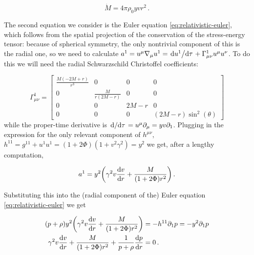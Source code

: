 \documentclass[main.tex]{subfiles}
\begin{document}
\begin{equation} \label{eq:mass-conservation-integral}
  \dot{M} = 4 \pi\rho_0 yvr^2 \,.
\end{equation}

The second equation we consider is the Euler equation \eqref{eq:relativistic-euler}, which follows from the spatial projection of the conservation of the stress-energy tensor:
because of spherical symmetry, the only nontrivial component of this is the radial one, so we need to calculate \(a^1 = u^\mu \nabla_\mu u^1 = \dv*{u^1}{\tau} + \Gamma^1_{\mu \nu} u^\mu u^\nu \). To do this we will need the radial Schwarzschild Christoffel coefficients:

\begin{equation}
  \Gamma^1_{\mu \nu} = \left[\begin{matrix}\frac{M \left(- 2 M + r\right)}{r^{3}} & 0 & 0 & 0\\0 & \frac{M}{r \left(2 M - r\right)} & 0 & 0\\0 & 0 & 2 M - r & 0\\0 & 0 & 0 & \left(2 M - r\right) \sin^{2}{\left(\theta \right)}\end{matrix}\right]
\end{equation}
while the proper-time derivative is \(\dv*{}{\tau} = u^\mu \partial_\mu = yv\partial_1\).
Plugging in the expression for the only relevant component of \(h^{\mu\nu}\), \(h^{11} = g^{11} + u^1 u^1 = (1 + 2 \Phi) (1 + v^2 \gamma^2) = y^2\)
we get, after a lengthy computation,

\begin{equation}
  a^1 = y^2 \qty(\gamma^2 v \dv{v}{r} + \frac{M}{(1+ 2 \Phi) r^2}) \,.
\end{equation}

Substituting this into the (radial component of the) Euler equation \eqref{eq:relativistic-euler} we get

\begin{subequations}
\begin{align}
  (p + \rho) y^2 \qty(\gamma^2 v \dv{v}{r} + \frac{M}{(1+ 2 \Phi) r^2}) &= - h^{1 1} \partial_1 p = - y^2 \partial_1 p \\
   \gamma^2 v \dv{v}{r} + \frac{M}{(1+ 2 \Phi) r^2} + \frac{1}{p + \rho} \dv{p}{r} &= 0 \,.
  \label{eq:ideal-euler}
\end{align}
\end{subequations}

\end{document}
